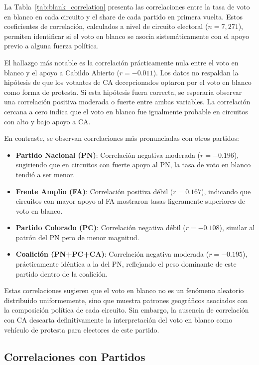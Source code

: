 La Tabla~\ref{tab:blank_correlation} presenta las correlaciones entre la tasa de voto en blanco en cada circuito y el share de cada partido en primera vuelta. Estos coeficientes de correlación, calculados a nivel de circuito electoral ($n=7{,}271$), permiten identificar si el voto en blanco se asocia sistemáticamente con el apoyo previo a alguna fuerza política.



El hallazgo más notable es la correlación prácticamente nula entre el voto en blanco y el apoyo a Cabildo Abierto ($r = -0.011$). Los datos no respaldan la hipótesis de que los votantes de CA decepcionados optaron por el voto en blanco como forma de protesta. Si esta hipótesis fuera correcta, se esperaría observar una correlación positiva moderada o fuerte entre ambas variables. La correlación cercana a cero indica que el voto en blanco fue igualmente probable en circuitos con alto y bajo apoyo a CA.

En contraste, se observan correlaciones más pronunciadas con otros partidos:

\begin{itemize}
    \item \textbf{Partido Nacional (PN)}: Correlación negativa moderada ($r = -0.196$), sugiriendo que en circuitos con fuerte apoyo al PN, la tasa de voto en blanco tendió a ser menor.
    \item \textbf{Frente Amplio (FA)}: Correlación positiva débil ($r = 0.167$), indicando que circuitos con mayor apoyo al FA mostraron tasas ligeramente superiores de voto en blanco.
    \item \textbf{Partido Colorado (PC)}: Correlación negativa débil ($r = -0.108$), similar al patrón del PN pero de menor magnitud.
    \item \textbf{Coalición (PN+PC+CA)}: Correlación negativa moderada ($r = -0.195$), prácticamente idéntica a la del PN, reflejando el peso dominante de este partido dentro de la coalición.
\end{itemize}

Estas correlaciones sugieren que el voto en blanco no es un fenómeno aleatorio distribuido uniformemente, sino que muestra patrones geográficos asociados con la composición política de cada circuito. Sin embargo, la ausencia de correlación con CA descarta definitivamente la interpretación del voto en blanco como vehículo de protesta para electores de este partido.

\subsection{Correlaciones con Partidos}
\label{subsec:blank_correlations}

